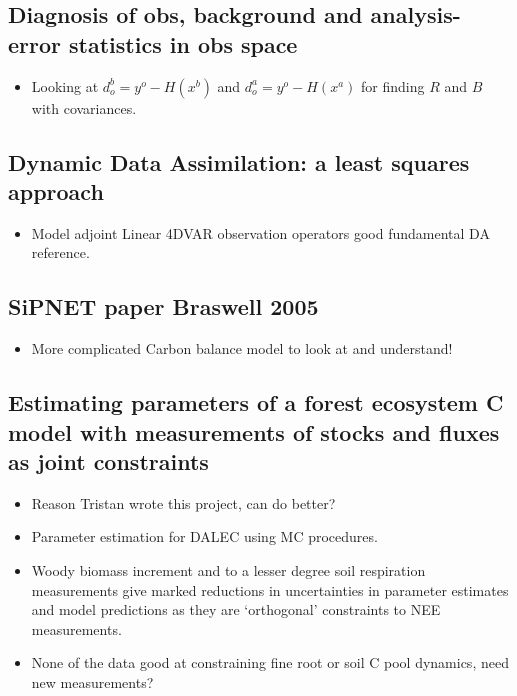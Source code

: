 \documentclass[11pt]{article}
\begin{document}
\subsection*{Diagnosis of obs, background and analysis-error statistics in obs space \cite{desroziers2005diagnosis}}
\begin{itemize}
\item Looking at $d_o^b = y^o-H(x^b)$ and $d_o^a = y^o-H(x^a)$ for finding $R$ and $B$ with covariances.
\end{itemize}


\subsection*{Dynamic Data Assimilation: a least squares approach \cite{lewis2006dynamic}}
\begin{itemize}
\item Model adjoint Linear 4DVAR observation operators good fundamental DA reference.
\end{itemize}


\subsection*{SiPNET paper Braswell 2005 \cite{braswell2005estimating}}
\begin{itemize}
\item More complicated Carbon balance model to look at and understand!
\end{itemize}


\subsection*{Estimating parameters of a forest ecosystem C model with measurements of stocks and fluxes as joint constraints \cite{richardson2010estimating}}
\begin{itemize}
\item Reason Tristan wrote this project, can do better?
\item Parameter estimation for DALEC using MC procedures.
\item Woody biomass increment and to a lesser degree soil respiration measurements give marked reductions in uncertainties in parameter estimates and model predictions as they are `orthogonal' constraints to NEE measurements.
\item None of the data good at constraining fine root or soil C pool dynamics, need new measurements? 
\end{itemize}
\end{document}
